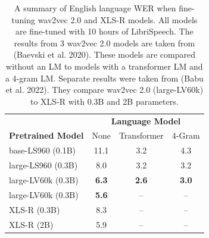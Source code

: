 \begin{table}[t]
    \centering
    \begin{tabular}{l | c c c}        
        \hline %
          & \multicolumn{3}{c}{\textbf{Language Model}}  \\
         \textbf{Pretrained Model}  & \multicolumn{1}{c}{None} & \multicolumn{1}{c}{Transformer}  & \multicolumn{1}{c}{4-Gram} \\

         \hline 
        
        base-LS960 (0.1B) \cite{wav2vec} & 11.1  & 3.2 & 4.3  \\%
        large-LS960 (0.3B) \cite{wav2vec} & 8.0  & 3.2  & 3.2  \\%
        large-LV60k (0.3B) \cite{wav2vec} & \textbf{6.3}  & \textbf{2.6}  & \textbf{3.0}  \\%

        \hline %
        large-LV60k (0.3B) \cite{babu2021xlsr}  & \textbf{5.6}  & -- & -- \\%
        XLS-R (0.3B) \cite{babu2021xlsr}   & 8.3  & -- & -- \\%
        XLS-R (2B) \cite{babu2021xlsr}  & 5.9  & -- & -- \\%
        \hline
    \end{tabular}
    
    \caption{A summary of English language WER when fine-tuning wav2vec 2.0 and XLS-R models. All models are fine-tuned with 10 hours of LibriSpeech. The results from 3 wav2vec 2.0 models are taken from (Baevski et al. 2020). These models are compared without an LM to models with a transformer LM and a 4-gram LM. Separate results were taken from (Babu et al. 2022). They compare wav2vec 2.0 (large-LV60k) to XLS-R with 0.3B and 2B parameters.}
    \label{lr_tab:wav2vec2_xlsr_english_wer}
\end{table}

